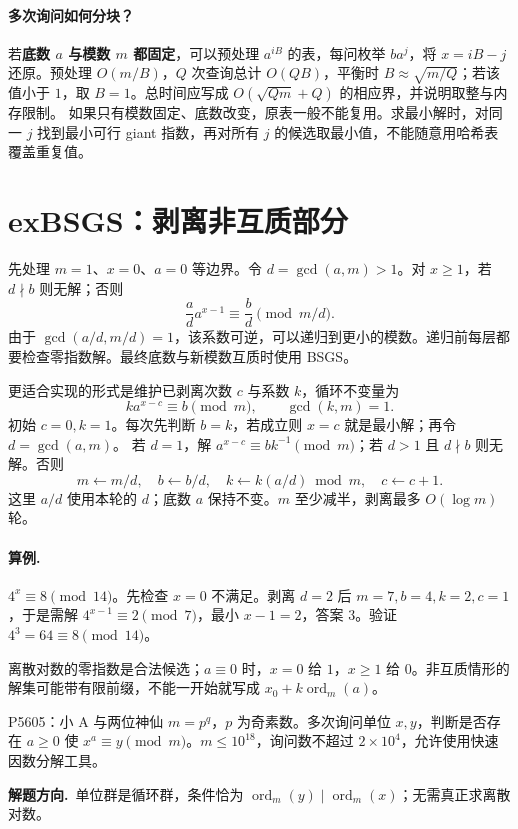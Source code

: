 \documentclass[UTF8,a4paper,11pt,oneside,openany,fontset=fandol]{ctexbook}
\theoremstyle{definition}
\newcommand{\ord}{\operatorname{ord}}
\newcommand{\hint}{\par\noindent\textbf{解题方向.}\ }
\begin{document}
\paragraph{多次询问如何分块？}
若\textbf{底数 $a$ 与模数 $m$ 都固定}，可以预处理 $a^{iB}$ 的表，每问枚举 $ba^j$，将 $x=iB-j$ 还原。预处理 $O(m/B)$，$Q$ 次查询总计 $O(QB)$，平衡时 $B\approx\sqrt{m/Q}$；若该值小于 $1$，取 $B=1$。总时间应写成 $O(\sqrt{Qm}+Q)$ 的相应界，并说明取整与内存限制。
如果只有模数固定、底数改变，原表一般不能复用。求最小解时，对同一 $j$ 找到最小可行 giant 指数，再对所有 $j$ 的候选取最小值，不能随意用哈希表覆盖重复值。


\section{exBSGS：剥离非互质部分}
先处理 $m=1$、$x=0$、$a=0$ 等边界。令 $d=\gcd(a,m)>1$。对 $x\ge1$，若 $d\nmid b$ 则无解；否则
\[
 \frac ad a^{x-1}\equiv\frac bd\pmod{m/d}.
\]
由于 $\gcd(a/d,m/d)=1$，该系数可逆，可以递归到更小的模数。递归前每层都要检查零指数解。最终底数与新模数互质时使用 BSGS。


更适合实现的形式是维护已剥离次数 $c$ 与系数 $k$，循环不变量为
\[
 k a^{x-c}\equiv b\pmod m,\qquad\gcd(k,m)=1.
\]
初始 $c=0,k=1$。每次先判断 $b=k$，若成立则 $x=c$ 就是最小解；再令 $d=\gcd(a,m)$。
若 $d=1$，解 $a^{x-c}\equiv bk^{-1}\pmod m$；若 $d>1$ 且 $d\nmid b$ 则无解。否则
\[
 m\gets m/d,\quad b\gets b/d,\quad
 k\gets k(a/d)\bmod m,\quad c\gets c+1.
\]
这里 $a/d$ 使用本轮的 $d$；底数 $a$ 保持不变。$m$ 至少减半，剥离最多 $O(\log m)$ 轮。

\paragraph{算例.} $4^x\equiv8\pmod{14}$。先检查 $x=0$ 不满足。剥离 $d=2$ 后 $m=7,b=4,k=2,c=1$，于是需解 $4^{x-1}\equiv2\pmod7$，最小 $x-1=2$，答案 $3$。验证 $4^3=64\equiv8\pmod{14}$。
\begin{pitfall}
离散对数的零指数是合法候选；$a\equiv0$ 时，$x=0$ 给 $1$，$x\ge1$ 给 $0$。非互质情形的解集可能带有限前缀，不能一开始就写成 $x_0+k\ord_m(a)$。
\end{pitfall}


\begin{problem}{P5605：小 A 与两位神仙}
$m=p^q$，$p$ 为奇素数。多次询问单位 $x,y$，判断是否存在 $a\ge0$ 使 $x^a\equiv y\pmod m$。$m\le10^{18}$，询问数不超过 $2\times10^4$，允许使用快速因数分解工具。
\end{problem}
\hint 单位群是循环群，条件恰为 $\ord_m(y)\mid\ord_m(x)$；无需真正求离散对数。
\end{document}
